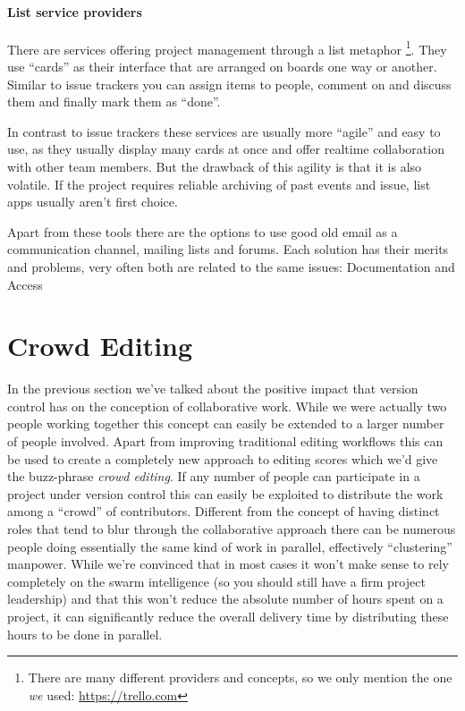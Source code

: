 \documentclass[11pt,a4paper]{article}
\begin{document}
\paragraph{List service providers}
There are services offering project management through a list metaphor%
\footnote{There are many different providers and concepts, so we only mention the one
\emph{we} used: \url{https://trello.com}}.
They use “cards” as their interface that are arranged on boards one way or another.
Similar to issue trackers you can assign items to people, comment on and discuss them and
finally mark them as “done”.

In contrast to issue trackers these services are usually more “agile” and easy to use, as
they usually display many cards at once and offer realtime collaboration with other
team members. But the drawback of this agility is that it is also volatile. If the project
requires reliable archiving of past events and issue, list apps usually aren't first choice.

\medskip
Apart from these tools there are the options to use good old email as a communication channel, mailing lists and forums. Each solution has their merits and problems, very often both are related to the same issues: Documentation and Access


\section{Crowd Editing}
In the previous section we've talked about the positive impact that version control
has on the conception of collaborative work. While we were actually two people
working together this concept can easily be extended to a larger number of people
involved. Apart from improving traditional editing workflows this can be used to create a
completely new approach to editing scores which we'd give the buzz-phrase \emph{crowd
editing}. If any number of people can participate in a project under version control
this can easily be exploited to distribute the work among a “crowd” of contributors.
Different from the concept of having distinct roles that tend to blur through the
collaborative approach there can be numerous people doing essentially the same kind
of work in parallel, effectively “clustering” manpower. While we're convinced that
in most cases it won't make sense to rely completely on the swarm intelligence (so
you should still have a firm project leadership) and that this won't reduce the
absolute number of hours spent on a project, it can significantly reduce the overall
delivery time by distributing these hours to be done in parallel.
\end{document}
